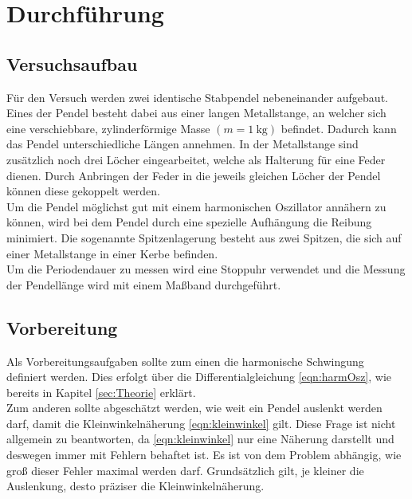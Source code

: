 \section{Durchführung}
\label{sec:Durchführung}
\subsection{Versuchsaufbau}
Für den Versuch werden zwei identische Stabpendel nebeneinander aufgebaut. Eines der Pendel besteht dabei aus einer langen Metallstange, an welcher sich eine
verschiebbare, zylinderförmige Masse $(m=\SI{1}{\kilo\gram})$ befindet. Dadurch kann das Pendel unterschiedliche Längen annehmen. In der Metallstange sind zusätzlich
noch drei Löcher eingearbeitet, welche als Halterung für eine Feder dienen. Durch Anbringen der Feder in die jeweils gleichen Löcher der Pendel können diese
gekoppelt werden.
\\
Um die Pendel möglichst gut mit einem harmonischen Oszillator annähern zu können, wird bei dem Pendel durch eine spezielle Aufhängung die Reibung minimiert.
Die sogenannte Spitzenlagerung besteht aus zwei Spitzen, die sich auf einer Metallstange in einer Kerbe befinden.
\\
Um die Periodendauer zu messen wird eine Stoppuhr verwendet und die Messung der Pendellänge wird mit einem Maßband durchgeführt.
\subsection{Vorbereitung}
Als Vorbereitungsaufgaben sollte zum einen die harmonische Schwingung definiert werden. Dies erfolgt über die Differentialgleichung
\eqref{eqn:harmOsz}, wie bereits in Kapitel \ref{sec:Theorie} erklärt.
\\
Zum anderen sollte  abgeschätzt werden, wie weit ein Pendel auslenkt werden darf, damit die Kleinwinkelnäherung \eqref{eqn:kleinwinkel}
gilt. Diese Frage ist nicht allgemein zu beantworten, da \eqref{eqn:kleinwinkel} nur eine Näherung darstellt und deswegen immer
mit Fehlern behaftet ist. Es ist von dem Problem abhängig, wie groß dieser Fehler maximal werden darf. Grundsätzlich gilt, je kleiner
die Auslenkung, desto präziser die Kleinwinkelnäherung.

